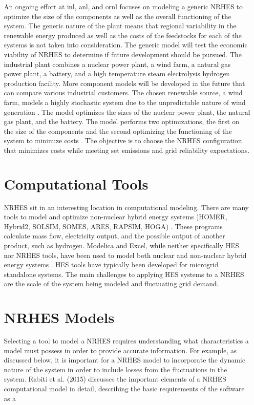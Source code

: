 An ongoing effort at \ac{inl}, \ac{anl}, and \ac{ornl} focuses on modeling a generic NRHES to optimize the size of the components as well as the overall functioning of the system. The generic nature of the plant means that regional variability in the renewable energy produced as well as the costs of the feedstocks for each of the systems is not taken into consideration. The generic model will test the economic viability of NRHES to determine if future development should be pursued. The industrial plant combines a nuclear power plant, a wind farm, a natural gas power plant, a battery, and a high temperature steam electrolysis hydrogen production facility. More component models will be developed in the future that can compare various industrial customers\cite{Harrison2016}. The chosen renewable source, a wind farm, models a highly stochastic system due to the unpredictable nature of wind generation \cite{Chen2016_wind}. The model optimizes the sizes of the nuclear power plant, the natural gas plant, and the battery. The model performs two optimizations, the first on the size of the components and the second optimizing the functioning of the system to minimize costs \cite{redfoot_rabiti_2018}. The objective is to choose the NRHES configuration that minimizes costs while meeting set emissions and grid reliability expectations.

\section{Computational Tools}
NRHES sit in an interesting location in computational modeling. There are many tools to model and optimize non-nuclear hybrid energy systems (HOMER, Hybrid2, SOLSIM, SOMES, ARES, RAPSIM, HOGA) \cite {Bernal-Agustin2009}. These programs calculate mass flow, electricity output, and the possible output of another product, such as hydrogen. Modelica and Excel, while neither specifically HES nor NRHES tools, have been used to model both nuclear and non-nuclear hybrid energy systems \cite{Shropshire2012, Chen2016, Binder2014, Garcia2015, Epiney2016}. HES tools have typically been developed for microgrid standalone systems. The main challenges to applying HES systems to a NRHES are the scale of the system being modeled and fluctuating grid demand.

\section{NRHES Models}
Selecting a tool to model a NRHES requires understanding what characteristics a model must possess in order to provide accurate information. For example, as discussed below, it is important for a NRHES model to incorporate the dynamic nature of the system in order to include losses from the fluctuations in the system. Rabiti et al. (2015) discusses the important elements of a NRHES computational model in detail, describing the basic requirements of the software as a

